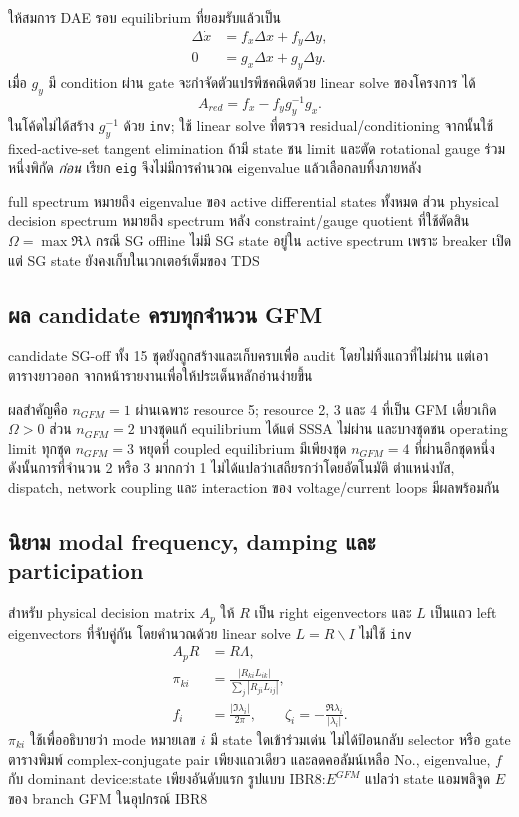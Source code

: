 \documentclass[12pt,a4paper]{article}
\begin{document}
ให้สมการ DAE รอบ equilibrium ที่ยอมรับแล้วเป็น
\begin{align}
\Delta\dot x &= f_x\Delta x+f_y\Delta y,\\
0&=g_x\Delta x+g_y\Delta y.
\end{align}
เมื่อ $g_y$ มี condition ผ่าน gate จะกำจัดตัวแปรพีชคณิตด้วย linear solve ของโครงการ ได้
\begin{equation}
A_{red}=f_x-f_yg_y^{-1}g_x.
\label{eq:ared-th}
\end{equation}
ในโค้ดไม่ได้สร้าง $g_y^{-1}$ ด้วย \texttt{inv}; ใช้ linear solve ที่ตรวจ residual/conditioning
จากนั้นใช้ fixed-active-set tangent elimination ถ้ามี state ชน limit และตัด rotational gauge ร่วมหนึ่งพิกัด
\emph{ก่อน} เรียก \texttt{eig} จึงไม่มีการคำนวณ eigenvalue แล้วเลือกลบทิ้งภายหลัง

full spectrum หมายถึง eigenvalue ของ active differential states ทั้งหมด ส่วน physical decision spectrum
หมายถึง spectrum หลัง constraint/gauge quotient ที่ใช้ตัดสิน $\Omega=\max\Re\lambda$ กรณี SG offline
ไม่มี SG state อยู่ใน active spectrum เพราะ breaker เปิด แต่ SG state ยังคงเก็บในเวกเตอร์เต็มของ TDS

\subsection{ผล candidate ครบทุกจำนวน GFM}

candidate SG-off ทั้ง 15 ชุดยังถูกสร้างและเก็บครบเพื่อ audit โดยไม่ทิ้งแถวที่ไม่ผ่าน แต่เอาตารางยาวออก
จากหน้ารายงานเพื่อให้ประเด็นหลักอ่านง่ายขึ้น

ผลสำคัญคือ $n_{GFM}=1$ ผ่านเฉพาะ resource 5; resource 2, 3 และ 4 ที่เป็น GFM เดี่ยวเกิด
$\Omega>0$ ส่วน $n_{GFM}=2$ บางชุดแก้ equilibrium ได้แต่ SSSA ไม่ผ่าน และบางชุดชน operating limit
ทุกชุด $n_{GFM}=3$ หยุดที่ coupled equilibrium มีเพียงชุด $n_{GFM}=4$ ที่ผ่านอีกชุดหนึ่ง
ดังนั้นการที่จำนวน 2 หรือ 3 มากกว่า 1 ไม่ได้แปลว่าเสถียรกว่าโดยอัตโนมัติ ตำแหน่งบัส, dispatch,
network coupling และ interaction ของ voltage/current loops มีผลพร้อมกัน

\subsection{นิยาม modal frequency, damping และ participation}

สำหรับ physical decision matrix $A_p$ ให้ $R$ เป็น right eigenvectors และ $L$ เป็นแถว left eigenvectors
ที่จับคู่กัน โดยคำนวณด้วย linear solve $L=R\backslash I$ ไม่ใช้ \texttt{inv}
\begin{align}
A_pR&=R\Lambda,\\
\pi_{ki}&=\frac{|R_{ki}L_{ik}|}{\sum_j|R_{ji}L_{ij}|},\\
f_i&=\frac{|\Im\lambda_i|}{2\pi},\qquad
\zeta_i=-\frac{\Re\lambda_i}{|\lambda_i|}.
\end{align}
$\pi_{ki}$ ใช้เพื่ออธิบายว่า mode หมายเลข $i$ มี state ใดเข้าร่วมเด่น ไม่ได้ป้อนกลับ selector หรือ gate
ตารางพิมพ์ complex-conjugate pair เพียงแถวเดียว และลดคอลัมน์เหลือ No., eigenvalue, $f$ กับ
dominant device:state เพียงอันดับแรก รูปแบบ IBR8:$E^{GFM}$ แปลว่า state แอมพลิจูด $E$
ของ branch GFM ในอุปกรณ์ IBR8
\end{document}
